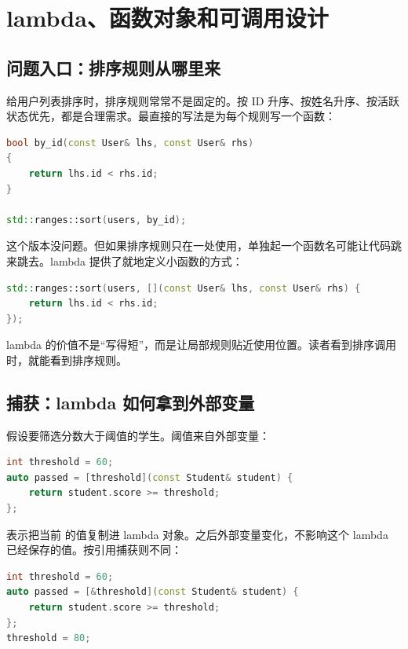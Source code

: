 \chapter{lambda、函数对象和可调用设计}

\section{问题入口：排序规则从哪里来}

给用户列表排序时，排序规则常常不是固定的。按 ID 升序、按姓名升序、按活跃状态优先，都是合理需求。最直接的写法是为每个规则写一个函数：

\begin{lstlisting}[language=C++,caption={普通比较函数}]
bool by_id(const User& lhs, const User& rhs)
{
    return lhs.id < rhs.id;
}

std::ranges::sort(users, by_id);
\end{lstlisting}

这个版本没问题。但如果排序规则只在一处使用，单独起一个函数名可能让代码跳来跳去。lambda 提供了就地定义小函数的方式：

\begin{lstlisting}[language=C++,caption={lambda 就地表达比较规则}]
std::ranges::sort(users, [](const User& lhs, const User& rhs) {
    return lhs.id < rhs.id;
});
\end{lstlisting}

lambda 的价值不是“写得短”，而是让局部规则贴近使用位置。读者看到排序调用时，就能看到排序规则。

\section{捕获：lambda 如何拿到外部变量}

假设要筛选分数大于阈值的学生。阈值来自外部变量：

\begin{lstlisting}[language=C++,caption={按值捕获阈值}]
int threshold = 60;
auto passed = [threshold](const Student& student) {
    return student.score >= threshold;
};
\end{lstlisting}

\code{[threshold]} 表示把当前  的值复制进 lambda 对象。之后外部变量变化，不影响这个 lambda 已经保存的值。按引用捕获则不同：

\begin{lstlisting}[language=C++,caption={按引用捕获阈值}]
int threshold = 60;
auto passed = [&threshold](const Student& student) {
    return student.score >= threshold;
};
threshold = 80;
\end{lstlisting}

